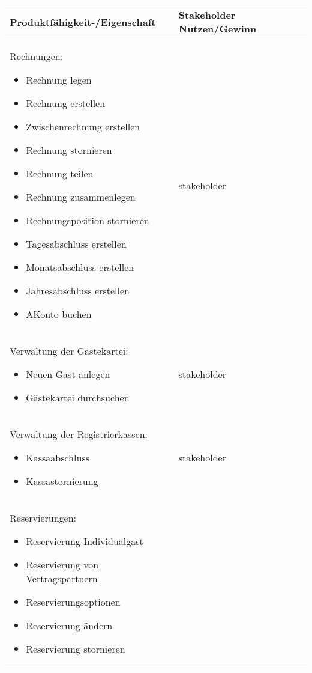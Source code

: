 \documentclass[../../Pflichtenheft.tex]{subfiles}
\begin{document}
    \begin{longtable}{|p{7cm}|p{7cm}|}
        \hline
        Produktfähigkeit-/Eigenschaft & Stakeholder Nutzen/Gewinn \\ \hline
        Rechnungen:
        \begin{itemize}
            \item Rechnung legen
            \item Rechnung erstellen
            \item Zwischenrechnung erstellen
            \item Rechnung stornieren
            \item Rechnung teilen
            \item Rechnung zusammenlegen
            \item Rechnungsposition stornieren
            \item Tagesabschluss erstellen
            \item Monatsabschluss erstellen
            \item Jahresabschluss erstellen
            \item AKonto buchen
        \end{itemize}
        & stakeholder
        \\ \hline
        Verwaltung der Gästekartei:
        \begin{itemize}
            \item Neuen Gast anlegen
            \item Gästekartei durchsuchen
        \end{itemize}
        & stakeholder
        \\ \hline
        Verwaltung der Registrierkassen:
        \begin{itemize}
            \item Kassaabschluss
            \item Kassastornierung
        \end{itemize}
        & stakeholder
        \\ \hline
        Reservierungen:
        \begin{itemize}
            \item Reservierung Individualgast
            \item Reservierung von Vertragspartnern
            \item Reservierungsoptionen
            \item Reservierung ändern
            \item Reservierung stornieren

\end{itemize}
\end{longtable}
\end{document}
